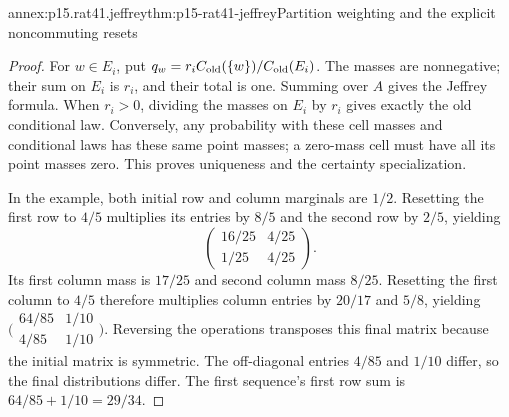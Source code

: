 \begin{annexitem}{annex:p15.rat41.jeffrey}{thm:p15-rat41-jeffrey}{Partition weighting and the explicit noncommuting resets}
\begin{proof}
For \(w\in E_i\), put
\(q_w=r_i C_{\rm old}(\{w\})/C_{\rm old}(E_i)\).
The masses are nonnegative; their sum on \(E_i\) is \(r_i\), and
their total is one. Summing over \(A\) gives the Jeffrey formula.
When \(r_i>0\), dividing the masses on \(E_i\) by \(r_i\) gives
exactly the old conditional law. Conversely, any probability with
these cell masses and conditional laws has these same point masses;
a zero-mass cell must have all its point masses zero. This proves
uniqueness and the certainty specialization.

In the example, both initial row and column marginals are \(1/2\).
Resetting the first row to \(4/5\) multiplies its entries by \(8/5\)
and the second row by \(2/5\), yielding
\[
                 \begin{pmatrix}16/25&4/25\\1/25&4/25\end{pmatrix}.
\]
Its first column mass is \(17/25\) and second column mass \(8/25\).
Resetting the first column to \(4/5\) therefore multiplies column
entries by \(20/17\) and \(5/8\), yielding
\(\bigl(\begin{smallmatrix}64/85&1/10\\4/85&1/10\end{smallmatrix}\bigr)\).
Reversing the operations transposes this final matrix because the
initial matrix is symmetric. The off-diagonal entries \(4/85\)
and \(1/10\) differ, so the final distributions differ. The first
sequence's first row sum is \(64/85+1/10=29/34\).
\end{proof}
\end{annexitem}

